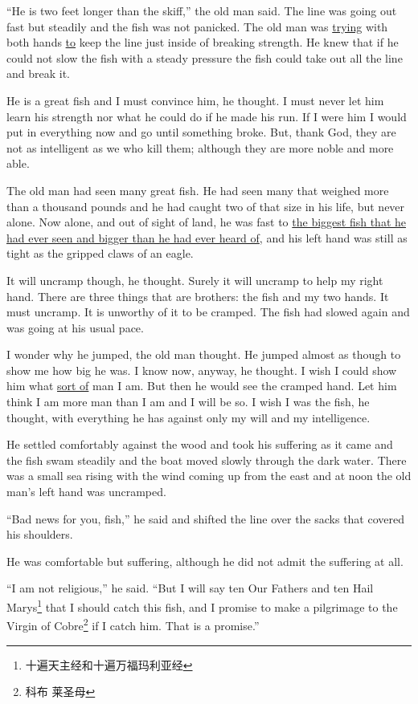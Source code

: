 \documentclass[fontset=ubuntu]{ctexrep}
\begin{document}
``He is two feet longer than the skiff,'' the old man said. The line was
going out fast but steadily and the fish was not \gls{panicked}. The old man
was \uline{trying} with both hands \uline{to} keep the line just inside of
breaking strength. He knew that if he could not slow the fish with a steady
pressure the fish could take out all the line and break it.

He is a great fish and I must \gls{convince} him, he thought. I must never
let him learn his strength nor what he could do if he made his run. If I
were him I would put in everything now and go until something broke. But,
thank God, they are not as \gls{intelligent} as we who kill them; although
they are more \gls{noble} and more \gls{able}.

The old man had seen many great fish. He had seen many that weighed more
than a thousand pounds and he had caught two of that size in his life, but
never alone. Now alone, and out of sight of land, he was fast to \uline{the
  biggest fish that he had ever seen and bigger than he had ever heard of},
and his left hand was still as tight as the gripped claws of an eagle.

It will uncramp though, he thought. Surely it will uncramp to help my right
hand. There are three things that are brothers: the fish and my two hands.
It must uncramp. It is \gls{unworthy} of it to be cramped. The fish had slowed
again and was going at his \gls{usual} \gls{pace}.

I wonder why he jumped, the old man thought. He jumped almost as though to
show me how big he was. I know now, anyway, he thought. I wish I could show
him what \uline{sort of} man I am. But then he would see the cramped hand. Let him
think I am more man than I am and I will be so. I wish I was the fish, he
thought, with everything he has against only my will and my intelligence.

He settled comfortably against the wood and took his \gls{suffering} as it
came and the fish swam steadily and the boat moved slowly through the dark
water. There was a small sea rising with the wind coming up from the east
and at noon the old man's left hand was uncramped.

``Bad news for you, fish,'' he said and shifted the line over the sacks that
covered his shoulders.

He was comfortable but suffering, although he did not \gls{admit} the
suffering at all.

``I am not \gls{religious},'' he said. ``But I will say ten Our Fathers and
ten Hail Marys\footnote{十遍天主经和十遍万福玛利亚经} that I should catch this fish,
and I promise to make a \gls{pilgrimage} to the Virgin of Cobre\footnote{科布
  莱圣母} if I catch him. That is a promise.''
\end{document}
